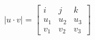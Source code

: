 \documentclass[preview]{standalone}
\begin{document}
\begin{align*}
|u\cdot v| = \begin{bmatrix} i & j & k \\ u_1 & u_2 & u_3 \\ v_1 & v_2 & v_3\end{bmatrix}
\end{align*}
\end{document}

